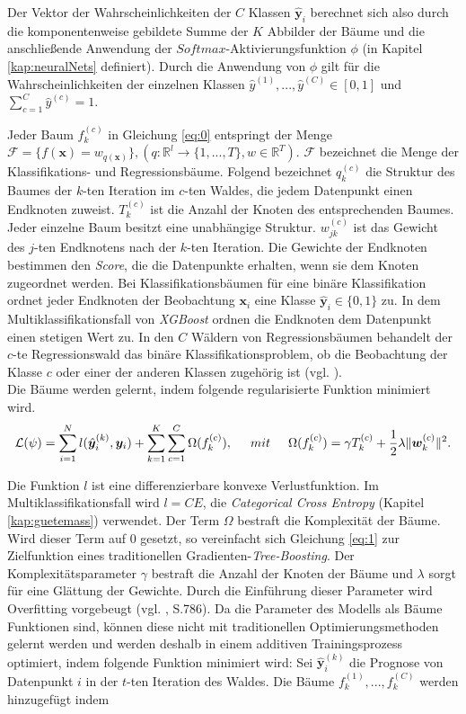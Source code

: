 \documentclass[a4paper,11pt]{article}
\begin{document}
Der Vektor der Wahrscheinlichkeiten der $C$ Klassen $\hat{\bm{y}}_i$ berechnet sich also durch die komponentenweise gebildete Summe der $K$ Abbilder der Bäume und die anschließende Anwendung der $Softmax$-Aktivierungsfunktion $\phi$ (in Kapitel \ref{kap:neuralNets} definiert). Durch die Anwendung von $\phi$ gilt für die Wahrscheinlichkeiten der einzelnen Klassen $\hat{y}^{(1)}, ..., \hat{y}^{(C)} \in [0,1]$ und $\sum_{c=1}^C \hat{y}^{(c)} = 1$.

Jeder Baum $f_k^{(c)}$ in Gleichung \ref{eq:0} entspringt der Menge $ \mathcal{F} = \{f(\bm{x}) = w_{q(\bm{x})} \}, (q: \mathbb{R}^l \xrightarrow{} \{1,...,T\}, w \in \mathbb{R}^T)$. $\mathcal{F}$ bezeichnet die Menge der Klassifikations- und Regressionsbäume. Folgend bezeichnet $q_k^{(c)}$ die Struktur des Baumes der $k$-ten Iteration im $c$-ten Waldes, die jedem Datenpunkt einen Endknoten zuweist. $T_k^{(c)}$ ist die Anzahl der Knoten des entsprechenden Baumes. Jeder einzelne Baum besitzt eine unabhängige Struktur. $w_{jk}^{(c)}$ ist das Gewicht des $j$-ten Endknotens nach der $k$-ten Iteration. Die Gewichte der Endknoten bestimmen den \textit{Score}, die die Datenpunkte erhalten, wenn sie dem Knoten zugeordnet werden. Bei Klassifikationsbäumen für eine binäre Klassifikation ordnet jeder Endknoten der Beobachtung $\bm{x}_i$ eine Klasse $\hat{\bm{y}}_i \in \{0,1\}$ zu. In dem Multiklassifikationsfall von \textit{XGBoost} ordnen die Endknoten dem Datenpunkt einen stetigen Wert zu. In den $C$ Wäldern von Regressionsbäumen behandelt der $c$-te Regressionswald das binäre Klassifikationsproblem, ob die Beobachtung der Klasse $c$ oder einer der anderen Klassen zugehörig ist (vgl. \cite{XGBoostR}).\\
Die Bäume werden gelernt, indem folgende regularisierte Funktion minimiert wird.
\begin{equation}\label{eq:1}
   \mathcal{L}(\psi) = \sum_{i=1}^N l(\hat{\bm{y}}_i^{(k)}, \bm{y}_i) + \sum_{k=1}^K \sum_{c=1}^C \Omega(f_k^{(c)}), \hspace{0.5cm} mit \hspace{0.5cm}
\Omega(f_k^{(c)}) = \gamma T_k^{(c)} + \frac{1}{2} \lambda \|\bm{w}_k^{(c)}\|^2 . 
\end{equation}


Die Funktion $l$ ist eine differenzierbare konvexe Verlustfunktion. Im Multiklassifikationsfall wird $l = CE$, die \textit{Categorical Cross Entropy} (Kapitel \ref{kap:guetemass}) verwendet. Der Term $\Omega$ bestraft die Komplexität der Bäume. Wird dieser Term auf $0$ gesetzt, so vereinfacht sich Gleichung \ref{eq:1} zur Zielfunktion eines traditionellen Gradienten-\textit{Tree-Boosting}. Der Komplexitätsparameter $\gamma$ bestraft die Anzahl der Knoten der Bäume und $\lambda$ sorgt für eine Glättung der Gewichte. Durch die Einführung dieser Parameter wird Overfitting vorgebeugt (vgl. \cite{XGBoost}, S.786).
Da die Parameter des Modells als Bäume Funktionen sind, können diese nicht mit traditionellen Optimierungsmethoden gelernt werden und werden deshalb in einem additiven Trainingsprozess optimiert, indem folgende Funktion minimiert wird:
Sei $\hat{\bm{y}}_i^{(k)}$ die Prognose von Datenpunkt $i$ in der $t$-ten Iteration des Waldes. Die Bäume $f_k^{(1)}, ..., f_k^{(C)}$ werden hinzugefügt indem 
\end{document}
